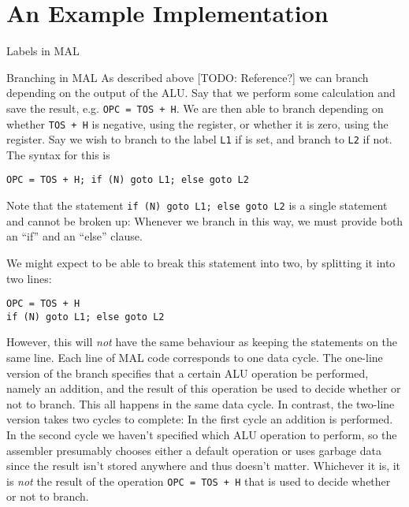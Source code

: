 \documentclass[article, a4paper, 11pt, oneside]{memoir}
\numberwithin{equation}{chapter}
\newcommand{\inlinecode}[1]{\colorbox{lightgray}{\vphantom{\texttt{jk}}\lstinline$#1$}}
\renewcommand{\inlinecode}{\lstinline}
\begin{document}
\section{An Example Implementation}

\begin{notelist}
\item[Labels in MAL]

\item[Branching in MAL]
As described above [TODO: Reference?] we can branch depending on the output of the ALU. Say that we perform some calculation and save the result, e.g. \inlinecode{OPC = TOS + H}. We are then able to branch depending on whether \inlinecode{TOS + H} is negative, using the  register, or whether it is zero, using the  register. Say we wish to branch to the label \inlinecode{L1} if  is set, and branch to \inlinecode{L2} if not. The syntax for this is
%
\begin{displayquote} %
    \inlinecode{OPC = TOS + H; if (N) goto L1; else goto L2}
\end{displayquote}
%
Note that the statement \inlinecode{if (N) goto L1; else goto L2} is a single statement and cannot be broken up: Whenever we branch in this way, we must provide both an \enquote{if} and an \enquote{else} clause.

We might expect to be able to break this statement into two, by splitting it into two lines:
%
\begin{displayquote}
    \inlinecode{OPC = TOS + H} \\
    \inlinecode{if (N) goto L1; else goto L2}
\end{displayquote}
%
However, this will \emph{not} have the same behaviour as keeping the statements on the same line. Each line of MAL code corresponds to one data cycle. The one-line version of the branch specifies that a certain ALU operation be performed, namely an addition, and the result of this operation be used to decide whether or not to branch. This all happens in the same data cycle. In contrast, the two-line version takes two cycles to complete: In the first cycle an addition is performed. In the second cycle we haven't specified which ALU operation to perform, so the assembler presumably chooses either a default operation or uses garbage data since the result isn't stored anywhere and thus doesn't matter. Whichever it is, it is \emph{not} the result of the operation \inlinecode{OPC = TOS + H} that is used to decide whether or not to branch.


\end{notelist}
\end{document}
